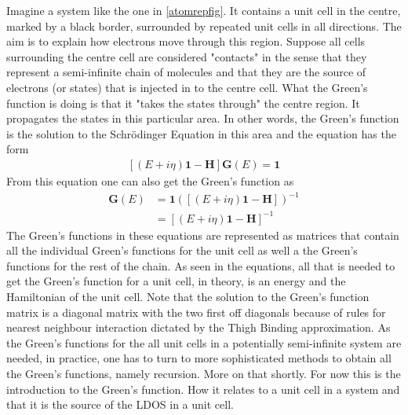 Imagine a system like the one in \cref{atomrepfig}. It contains a unit cell in the centre, marked by a black border, surrounded by repeated unit cells in all directions. The aim is to explain how electrons move through this region. Suppose all cells surrounding the centre cell are considered "contacts" in the sense that they represent a semi-infinite chain of molecules and that they are the source of electrons (or states) that is injected in to the centre cell. What the Green's function is doing is that it "takes the states through" the centre region. It propagates the states in this particular area. In other words, the Green's function is the solution to the Schr\"{o}dinger Equation in this area and the equation has the form 
\begin{align}\label{Greensunsolved}
    [(E+i\eta)\mathbf{1}-\mathbf{H}]\mathbf{G}(E) = \mathbf{1}
\end{align}
From this equation one can also get the Green's function as 
\begin{align}\label{Greenssolved}
    \mathbf{G}(E) &= \mathbf{1}([(E+i\eta)\mathbf{1}-\mathbf{H}])^{-1}\\
    & = [(E+i\eta)\mathbf{1}-\mathbf{H}]^{-1}
\end{align}
The Green's functions in these equations are represented as matrices that contain all the individual Green's functions for the unit cell as well a the Green's functions for the rest of the chain. As seen in the equations, all that is needed to get the Green's function for a unit cell, in theory, is an energy and the Hamiltonian of the unit cell. Note that the solution to the Green's function matrix is a diagonal matrix with the two first off diagonals because of rules for nearest neighbour interaction dictated by the Thigh Binding approximation. As the Green's functions for the all unit cells in a potentially semi-infinite system are needed, in practice, one has to turn to more sophisticated methods to obtain all the Green's functions, namely recursion. More on that shortly. For now this is the introduction to the Green's function. How it relates to a unit cell in a system and that it is the source of the LDOS in a unit cell.\\
